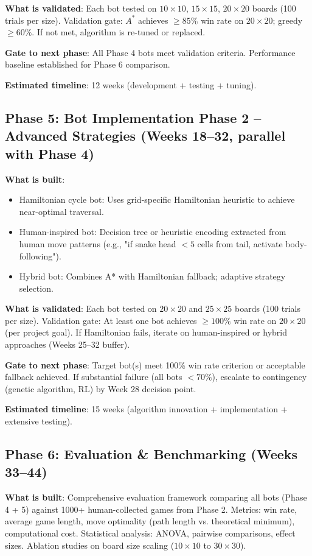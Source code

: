 \documentclass[11pt,a4paper]{article}
\begin{document}
\textbf{What is validated}: Each bot tested on $10 \times 10$, $15 \times 15$, $20 \times 20$ boards (100 trials per size). Validation gate: $A^*$ achieves $\geq 85\%$ win rate on $20 \times 20$; greedy $\geq 60\%$. If not met, algorithm is re-tuned or replaced.

\textbf{Gate to next phase}: All Phase 4 bots meet validation criteria. Performance baseline established for Phase 6 comparison.

\textbf{Estimated timeline}: 12 weeks (development + testing + tuning).

\subsection*{Phase 5: Bot Implementation Phase 2 -- Advanced Strategies (Weeks 18--32, parallel with Phase 4)}
\textbf{What is built}: 
\begin{itemize}
    \item Hamiltonian cycle bot: Uses grid-specific Hamiltonian heuristic to achieve near-optimal traversal.
    \item Human-inspired bot: Decision tree or heuristic encoding extracted from human move patterns (e.g., "if snake head $<5$ cells from tail, activate body-following").
    \item Hybrid bot: Combines A* with Hamiltonian fallback; adaptive strategy selection.
\end{itemize}

\textbf{What is validated}: Each bot tested on $20 \times 20$ and $25 \times 25$ boards (100 trials per size). Validation gate: At least one bot achieves $\geq 100\%$ win rate on $20 \times 20$ (per project goal). If Hamiltonian fails, iterate on human-inspired or hybrid approaches (Weeks 25--32 buffer).

\textbf{Gate to next phase}: Target bot(s) meet 100\% win rate criterion or acceptable fallback achieved. If substantial failure (all bots $<70\%$), escalate to contingency (genetic algorithm, RL) by Week 28 decision point.

\textbf{Estimated timeline}: 15 weeks (algorithm innovation + implementation + extensive testing).

\subsection*{Phase 6: Evaluation \& Benchmarking (Weeks 33--44)}
\textbf{What is built}: Comprehensive evaluation framework comparing all bots (Phase 4 + 5) against 1000+ human-collected games from Phase 2. Metrics: win rate, average game length, move optimality (path length vs. theoretical minimum), computational cost. Statistical analysis: ANOVA, pairwise comparisons, effect sizes. Ablation studies on board size scaling ($10 \times 10$ to $30 \times 30$).
\end{document}
